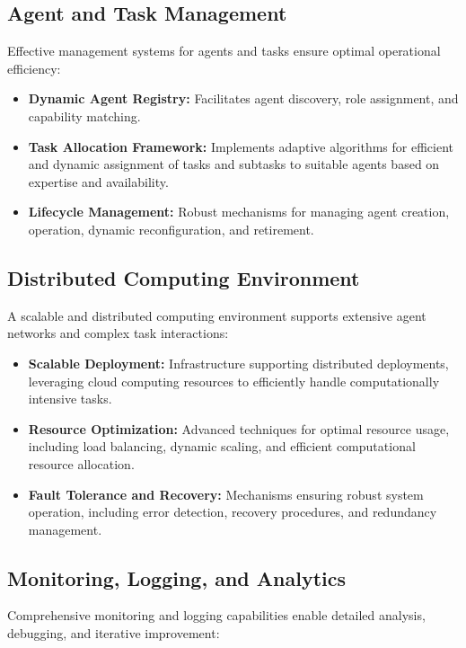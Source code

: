\documentclass[12pt]{amsart}
\begin{document}
\subsection{Agent and Task Management}

Effective management systems for agents and tasks ensure optimal operational efficiency:

\begin{itemize}
    \item \textbf{Dynamic Agent Registry:} Facilitates agent discovery, role assignment, and capability matching.
    \item \textbf{Task Allocation Framework:} Implements adaptive algorithms for efficient and dynamic assignment of tasks and subtasks to suitable agents based on expertise and availability.
    \item \textbf{Lifecycle Management:} Robust mechanisms for managing agent creation, operation, dynamic reconfiguration, and retirement.
\end{itemize}

\subsection{Distributed Computing Environment}

A scalable and distributed computing environment supports extensive agent networks and complex task interactions:

\begin{itemize}
    \item \textbf{Scalable Deployment:} Infrastructure supporting distributed deployments, leveraging cloud computing resources to efficiently handle computationally intensive tasks.
    \item \textbf{Resource Optimization:} Advanced techniques for optimal resource usage, including load balancing, dynamic scaling, and efficient computational resource allocation.
    \item \textbf{Fault Tolerance and Recovery:} Mechanisms ensuring robust system operation, including error detection, recovery procedures, and redundancy management.
\end{itemize}

\subsection{Monitoring, Logging, and Analytics}

Comprehensive monitoring and logging capabilities enable detailed analysis, debugging, and iterative improvement:
\end{document}
